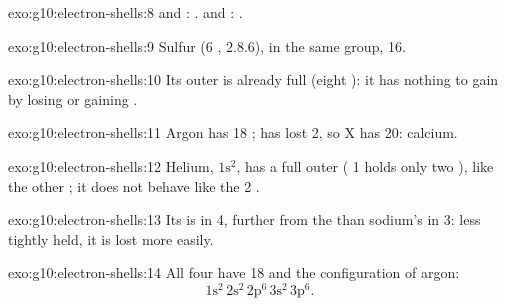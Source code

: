 \begin{solution}{exo:g10:electron-shells:8}
 and : .  and :
.
\end{solution}

\begin{solution}{exo:g10:electron-shells:9}
Sulfur (6 , $2.8.6$), in the same group, 16.
\end{solution}

\begin{solution}{exo:g10:electron-shells:10}
Its outer  is already full (eight ): it has nothing to gain
by losing or gaining .
\end{solution}

\begin{solution}{exo:g10:electron-shells:11}
Argon has 18 ;  has lost 2, so X has 20: calcium.
\end{solution}

\begin{solution}{exo:g10:electron-shells:12}
Helium, $1\mathrm{s}^2$, has a full outer  ( 1 holds only two
), like the other ; it does not behave like the  2
.
\end{solution}

\begin{solution}{exo:g10:electron-shells:13}
Its  is in  4, further from the  than sodium's
in  3: less tightly held, it is lost more easily.
\end{solution}

\begin{solution}{exo:g10:electron-shells:14}
All four have 18  and the configuration of argon:
\[ 1\mathrm{s}^2\,2\mathrm{s}^2\,2\mathrm{p}^6\,3\mathrm{s}^2\,3\mathrm{p}^6. \]
\end{solution}

